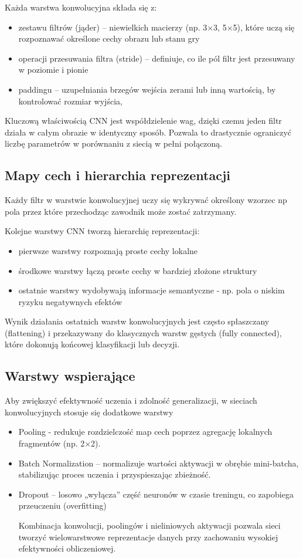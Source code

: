 Każda warstwa konwolucyjna składa się z:
\begin{itemize}
	\item zestawu filtrów (jąder) – niewielkich macierzy (np. 3×3, 5×5), które uczą się rozpoznawać określone cechy obrazu lub stanu gry
	\item operacji przesuwania filtra (stride) – definiuje, co ile pól filtr jest przesuwany w poziomie i pionie
	\item paddingu – uzupełniania brzegów wejścia zerami lub inną wartością, by kontrolować rozmiar wyjścia,
\end{itemize}

Kluczową właściwością CNN jest współdzielenie wag, dzięki czemu jeden filtr działa w całym obrazie w identyczny sposób. Pozwala to drastycznie ograniczyć liczbę parametrów w porównaniu z siecią w pełni połączoną.

\subsection*{Mapy cech i hierarchia reprezentacji}

Każdy filtr w warstwie konwolucyjnej uczy się wykrywać określony wzorzec np pola przez które przechodząc zawodnik może zostać zatrzymany.

Kolejne warstwy CNN tworzą hierarchię reprezentacji:
\begin{itemize}
	\item pierwsze warstwy rozpoznają proste cechy lokalne
	\item środkowe warstwy łączą proste cechy w bardziej złożone struktury
	\item ostatnie warstwy wydobywają informacje semantyczne - np. pola o niskim ryzyku negatywnych efektów 
\end{itemize}

Wynik działania ostatnich warstw konwolucyjnych jest często spłaszczany (flattening) i przekazywany do klasycznych warstw gęstych (fully connected), które dokonują końcowej klasyfikacji lub decyzji.

\subsection*{Warstwy wspierające}
Aby zwiększyć efektywność uczenia i zdolność generalizacji, w sieciach konwolucyjnych stosuje się dodatkowe warstwy

\begin{itemize}
	\item Pooling - redukuje rozdzielczość map cech poprzez agregację lokalnych fragmentów (np. 2×2). 
	\item Batch Normalization – normalizuje wartości aktywacji w obrębie mini-batcha, stabilizując proces uczenia i przyspieszając zbieżność.
	\item Dropout – losowo „wyłącza” część neuronów w czasie treningu, co zapobiega przeuczeniu (overfitting)
	
Kombinacja konwolucji, poolingów i nieliniowych aktywacji pozwala sieci tworzyć wielowarstwowe reprezentacje danych przy zachowaniu wysokiej efektywności obliczeniowej.

\end{itemize}

